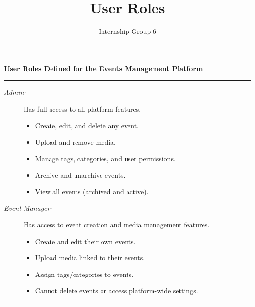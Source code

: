 \documentclass{article}
\title{User Roles}
\author{Internship Group 6}
\begin{document}
\maketitle

\noindent
\textbf{User Roles Defined for the Events Management Platform}
\par\noindent\rule{\textwidth}{0.5pt}

\begin{description}
    \item[\textit{Admin:}] Has full access to all platform features.
    \begin{itemize}
        \item Create, edit, and delete any event.
        \item Upload and remove media.
        \item Manage tags, categories, and user permissions.
        \item Archive and unarchive events.
        \item View all events (archived and active).
    \end{itemize}

    \item[\textit{Event Manager:}] Has access to event creation and media management features.
    \begin{itemize}
        \item Create and edit their own events.
        \item Upload media linked to their events.
        \item Assign tags/categories to events.
        \item Cannot delete events or access platform-wide settings.
    \end{itemize}
\end{description}

\par\noindent\rule{\textwidth}{0.5pt}
\end{document}
